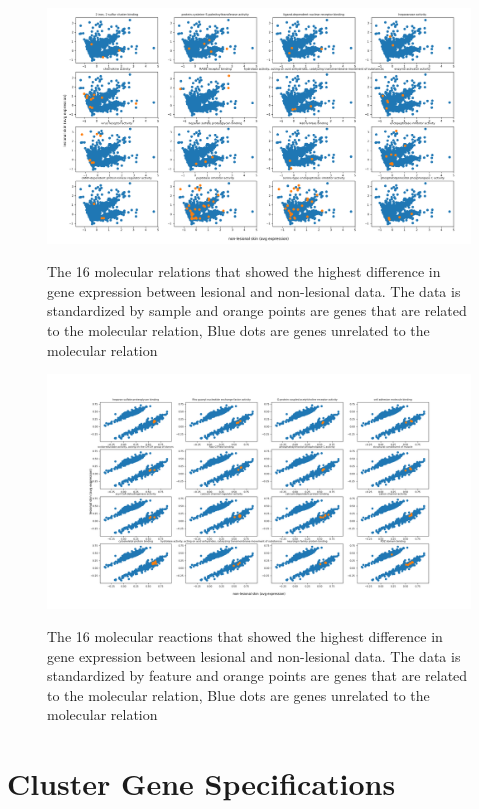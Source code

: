 \documentclass[10pt,a4paper]{article}
\begin{document}
	\begin{figure}[H]
		\includegraphics[width=1\textwidth]{Sign_Molecular_Psoriasis.png}
		\label{fig:MolecularScaledBySample}
		\caption{The 16 molecular relations that showed the highest difference in gene expression between lesional and non-lesional data. The data is standardized by sample and orange points are genes that are related to the molecular relation, Blue dots are genes unrelated to the molecular relation}
	\end{figure}
	
	\begin{figure}[H]
		\includegraphics[width=1\textwidth]{Sign_Molecular_Psoriasis_Scaled.png}
		\label{fig:MolecularScaledByFeature1}
		\caption{The 16 molecular reactions that showed the highest difference in gene expression between lesional and non-lesional data. The data is standardized by feature and orange points are genes that are related to the molecular relation, Blue dots are genes unrelated to the molecular relation}
	\end{figure}

	\section{Cluster Gene Specifications}
	\label{app:ClusterGeneSpecifications}
\end{document}
